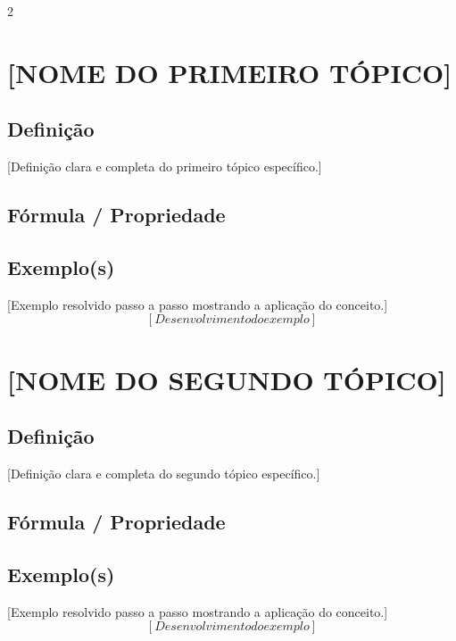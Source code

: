 \documentclass[11pt]{article}
\begin{document}
\begin{multicols}{2}
\section*{[NOME DO PRIMEIRO TÓPICO]}

\subsection*{Definição}
[Definição clara e completa do primeiro tópico específico.]

\subsection*{Fórmula / Propriedade}

\subsection*{Exemplo(s)}
[Exemplo resolvido passo a passo mostrando a aplicação do conceito.]
\[
[Desenvolvimento do exemplo]
\]

\section*{[NOME DO SEGUNDO TÓPICO]}

\subsection*{Definição}
[Definição clara e completa do segundo tópico específico.]

\subsection*{Fórmula / Propriedade}

\subsection*{Exemplo(s)}
[Exemplo resolvido passo a passo mostrando a aplicação do conceito.]
\[
[Desenvolvimento do exemplo]
\]


\end{multicols}
\end{document}
